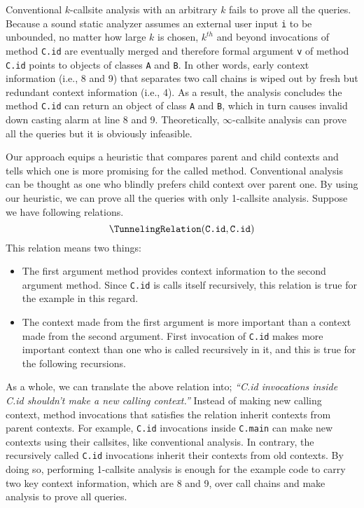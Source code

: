 Conventional $k$-callsite analysis with an arbitrary $k$ fails to prove all the queries. Because a sound static analyzer assumes an external user input \texttt{i} to be unbounded, no matter how large $k$ is chosen, $k^{th}$ and beyond invocations of method \texttt{C.id} are eventually merged and therefore formal argument \texttt{v} of method \texttt{C.id} points to objects of classes \texttt{A} and \texttt{B}. In other words, early context information (i.e., 8 and 9) that separates two call chains is wiped out by fresh but redundant context information (i.e., 4). As a result, the analysis concludes the method \texttt{C.id} can return an object of class \texttt{A} and \texttt{B}, which in turn causes invalid down casting alarm at line 8 and 9. Theoretically, $\infty$-callsite analysis can prove all the queries but it is obviously infeasible.

Our approach equips a heuristic that compares parent and child contexts and tells which one is more promising for the called method. Conventional analysis can be thought as one who blindly prefers child context over parent one. By using our heuristic, we can prove all the queries with only 1-callsite analysis. Suppose we have following relations.
\[
\TunnelingRelation({\texttt {C.id}}, {\texttt {C.id}})
\]
This relation means two things:
\begin{itemize}
  \item The first argument method provides context information to the second argument method. Since \texttt{C.id} is calls itself recursively, this relation is true for the example in this regard.
  \item The context made from the first argument is more important than a context made from the second argument. First invocation of \texttt{C.id} makes more important context than one who is called recursively in it, and this is true for the following recursions.
\end{itemize}

As a whole, we can translate the above relation into; \emph{``C.id invocations inside C.id shouldn't make a new calling context.''} Instead of making new calling context, method invocations that satisfies the relation inherit contexts from parent contexts. For example, \texttt{C.id} invocations inside \texttt{C.main} can make new contexts using their callsites, like conventional analysis. In contrary, the recursively called \texttt{C.id} invocations inherit their contexts from old contexts. By doing so, performing 1-callsite analysis is enough for the example code to carry two key context information, which are 8 and 9, over call chains and make analysis to prove all queries.

